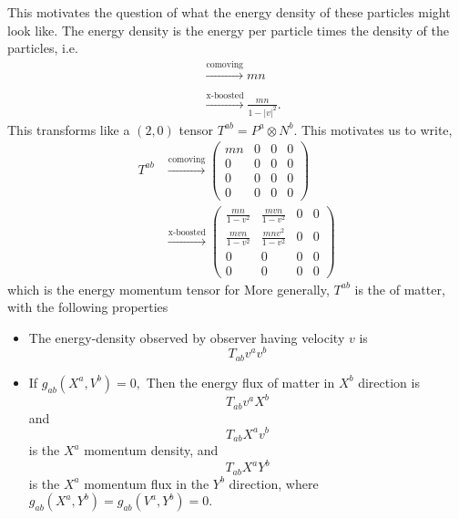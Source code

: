 \documentclass{article}
\numberwithin{equation}{section}
\begin{document}
This motivates the question of what the energy density of these particles might look like. The energy density is the energy per particle times the density of the particles, i.e.
\begin{align*}
    &\xrightarrow[]{\text{comoving}} mn \\ 
    &\xrightarrow[]{\text{x-boosted}} \frac{mn}{1-|v|^2}.
\end{align*}
This transforms like a $(2,0)$ tensor $T^{ab} = P^a \otimes N^b$. This motivates us to write,
\begin{align*}
    T^{ab} &\xrightarrow[]{\text{comoving}} \begin{pmatrix}
        mn &0 & 0 & 0 \\ 
        0 & 0 & 0 & 0 \\
        0 & 0 & 0 & 0 \\
        0 & 0 & 0 & 0
    \end{pmatrix} \\ 
    &\xrightarrow[]{\text{x-boosted}} \begin{pmatrix}
        \frac{mn}{1-v^2} & \frac{mvn}{1-v^2} & 0 & 0 \\
        \frac{mvn}{1-v^2} & \frac{mnv^2}{1-v^2} & 0 & 0 \\ 
        0 & 0 & 0 & 0 \\
        0 & 0 & 0 & 0
    \end{pmatrix}
\end{align*}
which is the energy momentum tensor for  More generally, $T^{ab}$ is the  of matter, with the following properties 
\begin{itemize}
    \item The energy-density observed by observer having velocity $v$ is 
    \begin{equation*}
        T_{ab}v^av^b
    \end{equation*}
    \item If $g_{ab}(X^a,V^b)=0,$ Then the energy flux of matter in $X^b$ direction is 
    \begin{equation*}
        T_{ab}v^aX^b
    \end{equation*}
    and 
    \begin{equation*}
        T_{ab}X^av^b
    \end{equation*}
    is the $X^a$ momentum density, and 
    \begin{equation*}
        T_{ab}X^aY^b
    \end{equation*}
    is the  $X^a$ momentum flux in the $Y^b$ direction, where $g_{ab}(X^a,Y^b)=g_{ab}(V^a,Y^b)=0.$
\end{itemize}
\end{document}
